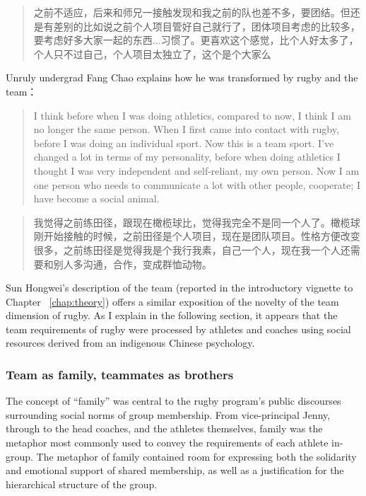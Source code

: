 \begin{CJK}{UTF8}{gbsn}
    \begin{quotation}
      之前不适应，后来和师兄一接触发现和我之前的队也差不多，要团结。但还是有差别的比如说之前个人项目管好自己就行了，团体项目考虑的比较多，要考虑好多大家一起的东西...习惯了。更喜欢这个感觉，比个人好太多了，个人只不过自己，个人项目太独立了，这个是个大家么 \\
    \end{quotation}

  Unruly undergrad Fang Chao explains how he was transformed by rugby and the team：

      \begin{quotation}
        I think before when I was doing athletics, compared to now, I think I am no longer the same person.  When I first came into contact with rugby, before I was doing an individual sport.  Now this is a team sport. I've changed a lot in terms of my personality, before when doing athletics I thought I was very independent and self-reliant, my own person.  Now I am one person who needs to communicate a lot with other people, cooperate; I have become a social animal.
      \end{quotation}

      \begin{quotation}
        我觉得之前练田径，跟现在橄榄球比，觉得我完全不是同一个人了。橄榄球刚开始接触的时候，之前田径是个人项目，现在是团队项目。性格方便改变很多，之前练田径是觉得我是个我行我素，自己一个人，现在我一个人还需要和别人多沟通，合作，变成群恤动物。
      \end{quotation}

Sun Hongwei's description of the team (reported in the introductory vignette to Chapter ~\ref{chap:theory}) offers a similar exposition of the novelty of the team dimension of rugby. As I explain in the following section, it appears that the team requirements of rugby were processed by athletes and coaches using social resources derived from an indigenous Chinese psychology.


\subsubsection{Team as family, teammates as brothers}
The concept of ``family'' was central to the rugby program's public discourses surrounding social norms of group membership.  From vice-principal Jenny, through to the head coaches, and the athletes themselves, family was the metaphor most commonly used to convey the requirements of each athlete in-group.  The metaphor of family contained room for expressing both the solidarity and emotional support of shared membership, as well as a justification for the hierarchical structure of the group.


\end{CJK}
